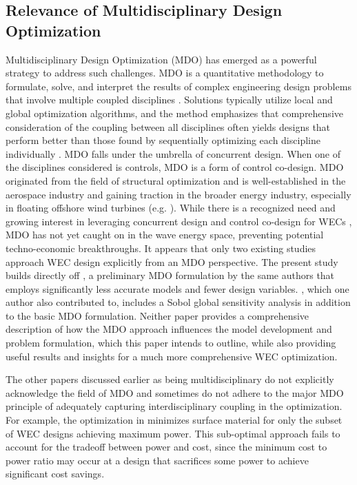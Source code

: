 \subsection{Relevance of Multidisciplinary Design Optimization}
Multidisciplinary Design Optimization (MDO) has emerged as a powerful strategy to address such challenges.
MDO is a quantitative methodology to formulate, solve, and interpret the results of complex engineering design problems that involve multiple coupled disciplines \cite{agteMDOAssessmentDirection2009}.
Solutions typically utilize local and global optimization algorithms, and the method emphasizes that comprehensive consideration of the coupling between all disciplines often yields designs that perform better than those found by sequentially optimizing each discipline individually \cite{martinsMultidisciplinaryDesignOptimization2013}.
MDO falls under the umbrella of concurrent design.
When one of the disciplines considered is controls, MDO is a form of control co-design.
MDO originated from the field of structural optimization and is well-established in the aerospace industry and gaining traction in the broader energy industry, especially in floating offshore wind turbines (e.g. \cite{abbas_control_2024,jasa_effectively_2022,patryniak_multidisciplinary_2022}).
While there is a recognized need and growing interest in leveraging concurrent design and control co-design for WECs \cite{mi_multi-scale_2025,ringwood_empowering_2023}, MDO has not yet caught on in the wave energy space, preventing potential techno-economic breakthroughs.
It appears that only two existing studies \cite{mccabe_multidisciplinary_2022,khanal_multi-objective_2024} approach WEC design explicitly from an MDO perspective.
The present study builds directly off \cite{mccabe_multidisciplinary_2022}, a preliminary MDO formulation by the same authors that employs significantly less accurate models and fewer design variables.
\cite{khanal_multi-objective_2024}, which one author also contributed to, includes a Sobol global sensitivity analysis in addition to the basic MDO formulation.
Neither paper provides a comprehensive description of how the MDO approach influences the model development and problem formulation, which this paper intends to outline, while also providing useful results and insights for a much more comprehensive WEC optimization. 

The other papers discussed earlier as being multidisciplinary do not explicitly acknowledge the field of MDO and sometimes do not adhere to the major MDO principle of adequately capturing interdisciplinary coupling in the optimization.
For example, the optimization in \cite{edwards_optimisation_2022} minimizes surface material for only the subset of WEC designs achieving maximum power.
This sub-optimal approach fails to account for the tradeoff between power and cost, since the minimum cost to power ratio may occur at a design that sacrifices some power to achieve significant cost savings.

